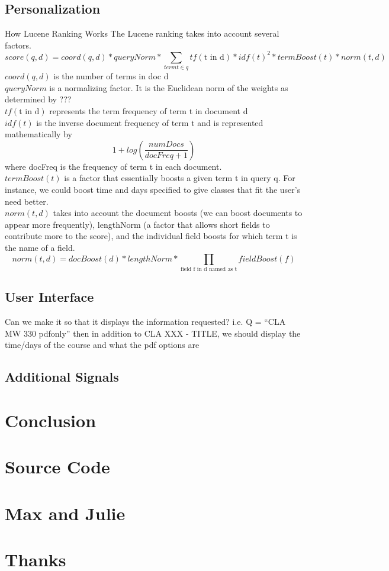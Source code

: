 \documentclass[12pt,letterpaper]{article}
\begin{document}
	\subsection{Personalization}
		How Lucene Ranking Works
		The Lucene ranking takes into account several factors. 
		\begin{equation}
			score(q,d) = coord(q,d) * queryNorm * \sum_{term t \in q}{tf(\text{t in d}) * idf(t)^2 * termBoost(t) * norm(t,d)}
		\label{eq:practical}
		\end{equation}
		$coord(q,d)$ is the number of terms in doc d\\
		$queryNorm$ is a normalizing factor. It is the Euclidean norm of the weights as determined by ???\\
		$tf(\text{t in d})$ represents the term frequency of term t in document d \\
		$idf(t)$ is the inverse document frequency of term t and is represented mathematically by \[ 1 + log(\frac{numDocs}{docFreq + 1}) \] where docFreq is the frequency of term t in each document. \\
		$termBoost(t)$ is a factor that essentially boosts a given term t in query q. For instance, we could boost time and days specified to give classes that fit the user's need better.\\
		$norm(t, d)$ takes into account the document boosts (we can boost documents to appear more frequently), lengthNorm (a factor that allows short fields to contribute more to the score), and the individual field boosts for which term t is the name of a field. 
		\[ norm(t,d) = docBoost(d) * lengthNorm * \prod_{\text{field f in d named as t}}{fieldBoost(f)} \] 				
	
	
	\subsection{User Interface}
	Can we make it so that it displays the information requested? i.e. Q = ``CLA MW 330 pdfonly'' then in addition to CLA XXX - TITLE, we should display the time/days of the course and what the pdf options are
	\subsection{Additional Signals}
	
\section{Conclusion}

\appendix

\section{Source Code}
\section{Max and Julie}
\section{Thanks}
\end{document}

